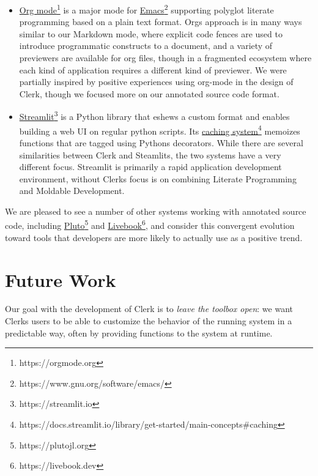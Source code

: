 \documentclass[sigconf,screen,pbalance=true]{acmart}
\begin{document}
\begin{itemize}
\item
  {\href{https://orgmode.org}{Org mode}\footnote{https://orgmode.org}} is a major mode for {\href{https://www.gnu.org/software/emacs/}{Emacs}\footnote{https://www.gnu.org/software/emacs/}} supporting polyglot literate programming based on a plain text format. Org\textquotesingle s approach is in many ways similar to our Markdown mode, where explicit code fences are used to introduce programmatic constructs to a document, and a variety of previewers are available for org files, though in a fragmented ecosystem where each kind of application requires a different kind of previewer. We were partially inspired by positive experiences using org-mode in the design of Clerk, though we focused more on our annotated source code format.
\item
  {\href{https://streamlit.io}{Streamlit}\footnote{https://streamlit.io}} is a Python library that eshews a custom format and enables building a web UI on regular python scripts. Its {\href{https://docs.streamlit.io/library/get-started/main-concepts\#caching}{caching system}\footnote{https://docs.streamlit.io/library/get-started/main-concepts\#caching}} memoizes functions that are tagged using Python\textquotesingle s decorators. While there are several similarities between Clerk and Steamlits, the two systems have a very different focus. Streamlit is primarily a rapid application development environment, without Clerk\textquotesingle s focus is on combining Literate Programming and Moldable Development.
\end{itemize}

We are pleased to see a number of other systems working with annotated source code, including {\href{https://plutojl.org}{Pluto}\footnote{https://plutojl.org}} and {\href{https://livebook.dev}{Livebook}\footnote{https://livebook.dev}}, and consider this convergent evolution toward tools that developers are more likely to actually use as a positive trend.

\hypertarget{future-work}{%
\section{Future Work}\label{future-work}}

Our goal with the development of Clerk is to \emph{leave the toolbox open}: we want Clerk\textquotesingle s users to be able to customize the behavior of the running system in a predictable way, often by providing functions to the system at runtime.
\end{document}
